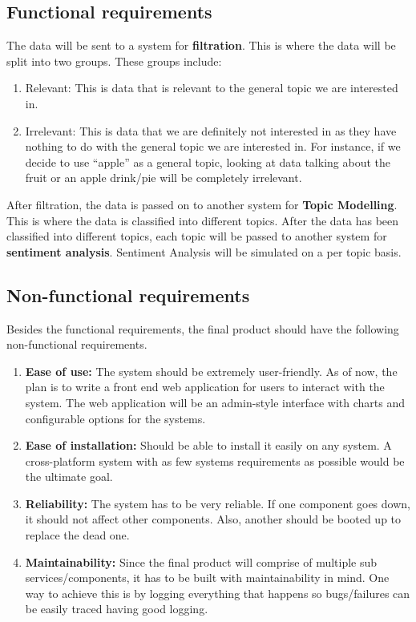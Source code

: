 \documentclass[12pt, a4paper]{article}
\begin{document}
\subsection{Functional requirements}
The data will be sent to a system for \textbf{filtration}. This is where the data will be split into
two groups. These groups include:
\begin{enumerate}
  \item Relevant: This is data that is relevant to the general topic we are interested in.
  \item Irrelevant: This is data that we are definitely not interested in as they have nothing to do
    with the general topic we are interested in. For instance, if we decide to use ``apple'' as a
    general topic, looking at data talking about the fruit or an apple drink/pie will be completely
    irrelevant.
\end{enumerate}

After filtration, the data is passed on to another system for \textbf{Topic Modelling}. This is
where the data is classified into different topics. After the data has been classified into
different topics, each topic will be passed to another system for \textbf{sentiment analysis}.
Sentiment Analysis will be simulated on a per topic basis.

\subsection{Non-functional requirements}
Besides the functional requirements, the final product should have the following non-functional
requirements.
\begin{enumerate}
  \item \textbf{Ease of use:} The system should be extremely user-friendly. As of now, the plan is
    to write a front end web application for users to interact with the system. The web application
    will be an admin-style interface with charts and configurable options for the systems.
  \item \textbf{Ease of installation:} Should be able to install it easily on any system. A
    cross-platform system with as few systems requirements as possible would be the ultimate goal.
  \item \textbf{Reliability:} The system has to be very reliable. If one component goes down, it
    should not affect other components. Also, another should be booted up to replace the dead one.
  \item \textbf{Maintainability:} Since the final product will comprise of multiple sub
    services/components, it has to be built with maintainability in mind. One way to achieve this
    is by logging everything that happens so bugs/failures can be easily traced having good logging.
\end{enumerate}
\end{document}

